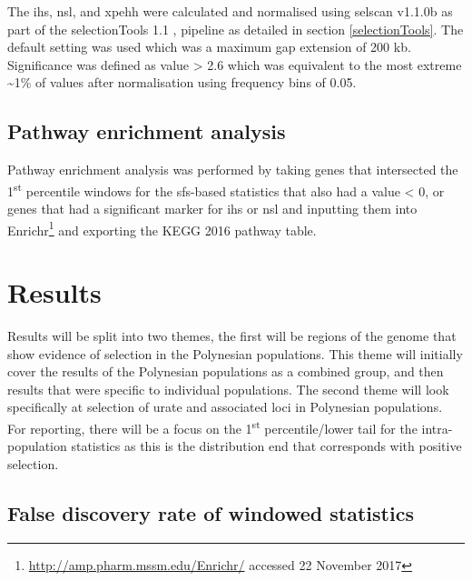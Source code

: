 \documentclass[]{report}
\begin{document}
The \gls{ihs}, \gls{nsl}, and \gls{xpehh} were calculated and normalised
using selscan v1.1.0b \citep{Szpiech2014} as part of the selectionTools
1.1 \citep{Cadzow2014}, pipeline as detailed in section
\ref{selectionTools}. The default setting was used which was a maximum
gap extension of 200 kb. Significance was defined as
\textbar{}value\textbar{} \textgreater{} 2.6 which was equivalent to the
most extreme \textasciitilde{}1\% of values after normalisation using
frequency bins of 0.05.

\subsection{Pathway enrichment
analysis}\label{pathway-enrichment-analysis}

Pathway enrichment analysis was performed by taking genes that
intersected the 1\textsuperscript{st} percentile windows for the
\glsdesc{sfs}-based statistics that also had a value \textless{} 0, or
genes that had a significant marker for \gls{ihs} or \gls{nsl} and
inputting them into Enrichr\footnote{\url{http://amp.pharm.mssm.edu/Enrichr/}
  accessed 22 November 2017} \citep{Chen2013b, Kuleshov2016} and
exporting the KEGG 2016 pathway table.




\section{Results}\label{results}

Results will be split into two themes, the first will be regions of the
genome that show evidence of selection in the Polynesian populations.
This theme will initially cover the results of the Polynesian
populations as a combined group, and then results that were specific to
individual populations. The second theme will look specifically at
selection of urate and associated loci in Polynesian populations. For
reporting, there will be a focus on the 1\textsuperscript{st}
percentile/lower tail for the intra-population statistics as this is the
distribution end that corresponds with positive selection.

\subsection{False discovery rate of windowed
statistics}\label{fdrresults}
\end{document}

